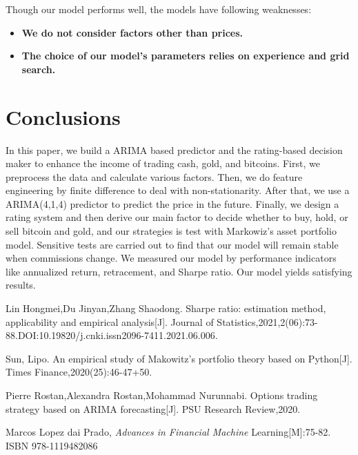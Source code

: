\documentclass[12pt,a4paper]{article}
\newcommand{\Predictor}{ARIMA }
\begin{document}
\begin{spacing}{1.2}
Though our model performs well, the models have following weaknesses:

\begin{itemize}
\item \textbf{We do not consider factors other than prices.}

\item \textbf{The choice of our model's parameters relies on experience and grid search.}
\end{itemize}


\section{Conclusions}
\label{Conclusions}

In this paper, we build a \Predictor based predictor and the rating-based decision maker to enhance the income of trading cash, gold, and bitcoins. First, we preprocess the data and calculate various factors. Then, we do feature engineering by finite difference to deal with non-stationarity. After that, we use a ARIMA(4,1,4) predictor to predict the price in the future. Finally, we design a rating system and then derive our main factor to decide whether to buy, hold, or sell bitcoin and gold, and our strategies is test with Markowiz's  asset portfolio model. Sensitive tests  are carried out to find that our model will remain stable when commissions change. We measured our model by performance indicators like annualized return, retracement, and Sharpe ratio. Our model yields satisfying results.




\newpage
\begin{thebibliography}{00}


Lin Hongmei,Du Jinyan,Zhang Shaodong. Sharpe ratio: estimation method, applicability and empirical analysis[J]. Journal of Statistics,2021,2(06):73-88.DOI:10.19820/j.cnki.issn2096-7411.2021.06.006.

Sun, Lipo. An empirical study of Makowitz's portfolio theory based on Python[J]. Times Finance,2020(25):46-47+50.

Pierre Rostan,Alexandra Rostan,Mohammad Nurunnabi. Options trading strategy based on ARIMA forecasting[J]. PSU Research Review,2020.


Marcos Lopez dai Prado, \textit{Advances in Financial Machine} Learning[M]:75-82. ISBN 978-1119482086


\end{thebibliography}
\end{spacing}
\end{document}
